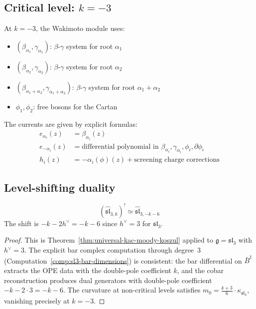 \subsection{\texorpdfstring{Critical level: $k = -3$}{Critical level: k = -3}}

\begin{theorem}\label{thm:w3-wakimoto-sl3}
At $k = -3$, the Wakimoto module uses:
\begin{itemize}
\item $(\beta_{\alpha_1}, \gamma_{\alpha_1})$: $\beta$-$\gamma$ system for root $\alpha_1$
\item $(\beta_{\alpha_2}, \gamma_{\alpha_2})$: $\beta$-$\gamma$ system for root $\alpha_2$
\item $(\beta_{\alpha_1+\alpha_2}, \gamma_{\alpha_1+\alpha_2})$: $\beta$-$\gamma$ system for root $\alpha_1+\alpha_2$
\item $\phi_1, \phi_2$: free bosons for the Cartan
\end{itemize}

The currents are given by explicit formulas:
\begin{align}
e_{\alpha_i}(z) &= \beta_{\alpha_i}(z) \\
e_{-\alpha_i}(z) &= \text{differential polynomial in } \beta_{\alpha_i}, \gamma_{\alpha_i}, \phi_i, \partial\phi_i \\
h_i(z) &= -\alpha_i(\phi)(z) + \text{screening charge corrections}
\end{align}
\end{theorem}

\subsection{Level-shifting duality}

\begin{theorem}\label{thm:sl3-koszul-dual}
\begin{equation}
(\widehat{\mathfrak{sl}}_{3,k})^! \simeq \widehat{\mathfrak{sl}}_{3,-k-6}
\end{equation}
The shift is $-k - 2h^\vee = -k - 6$ since $h^\vee = 3$ for $\mathfrak{sl}_3$.
\end{theorem}

\begin{proof}
This is Theorem~\ref{thm:universal-kac-moody-koszul} applied to $\mathfrak{g} = \mathfrak{sl}_3$ with $h^\vee = 3$.  The explicit bar complex computation through degree~3 (Computation~\ref{comp:sl3-bar-dimensions}) is consistent: the bar differential on $\bar{B}^1$ extracts the OPE data with the double-pole coefficient $k$, and the cobar reconstruction produces dual generators with double-pole coefficient $-k - 2 \cdot 3 = -k-6$.  The curvature at non-critical levels satisfies $m_0 = \frac{k+3}{6}\cdot\kappa_{\mathfrak{sl}_3}$, vanishing precisely at $k = -3$.
\end{proof}

